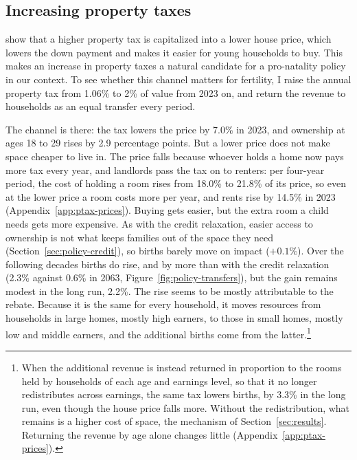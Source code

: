 \subsection{Increasing property taxes}
\label{sec:policy-transfers}

 \citet{coven2026} show that  a higher property
tax is capitalized into a lower house price, which lowers the down payment and
makes it easier for young households to buy. This makes an increase in property taxes a natural candidate for a pro-natality policy in our context. To see whether this channel
matters for fertility, I raise the annual property tax from 1.06\% to 2\% of
value from 2023 on, and return the revenue to households as an equal transfer
every period.

The channel is there: the tax lowers the price by 7.0\% in 2023, and
ownership at ages 18 to 29 rises by 2.9 percentage points. But a lower price
does not make space cheaper to live in. The price falls because whoever holds
a home now pays more tax every year, and landlords pass the tax on to renters:
per four-year period, the cost of holding a room rises from 18.0\% to 21.8\%
of its price, so even at the lower price a room costs more per year, and rents
rise by 14.5\% in 2023 (Appendix~\ref{app:ptax-prices}). Buying gets easier, but the extra room a child needs
gets more expensive. As with the credit relaxation, easier access to ownership
is not what keeps families out of the space they need
(Section~\ref{sec:policy-credit}), so births barely move on impact
($+0.1\%$). Over the following decades births do rise, and by more than with
the credit relaxation (2.3\% against 0.6\% in 2063,
Figure~\ref{fig:policy-transfers}), but the gain remains modest in the long
run, 2.2\%. The rise seems to be mostly attributable to the rebate.
Because it is the same for every household, it moves resources from households
in large homes, mostly high earners, to those in small homes, mostly low and
middle earners, and the additional births come from the
latter.\footnote{When the additional revenue is instead returned in proportion
to the rooms held by households of each age and earnings level, so that it no
longer redistributes across earnings, the same tax lowers births, by 3.3\% in
the long run, even though the house price falls more. Without the
redistribution, what remains is a higher cost of space, the mechanism of
Section~\ref{sec:results}. Returning the revenue by age alone changes
little (Appendix~\ref{app:ptax-prices}).}

